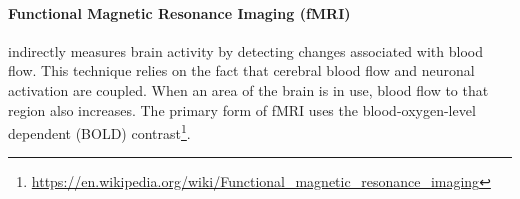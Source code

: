 \documentclass[main]{subfiles}
\begin{document}
\paragraph{Functional Magnetic Resonance Imaging (fMRI)} indirectly measures brain activity by detecting changes associated with blood flow. This technique relies on the fact that cerebral blood flow and neuronal activation are coupled. When an area of the brain is in use, blood flow to that region also increases. The primary form of fMRI uses the blood-oxygen-level dependent (BOLD) contrast\footnote{\url{https://en.wikipedia.org/wiki/Functional_magnetic_resonance_imaging}}.
\end{document}
